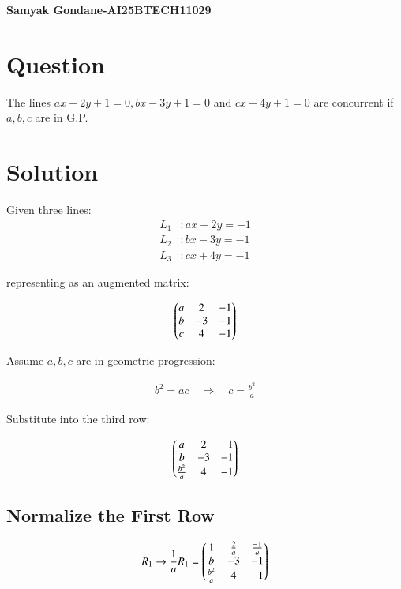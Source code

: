 \documentclass{article}
\begin{document}
\begin{center}
\large
    \textbf{Samyak Gondane-AI25BTECH11029}
\end{center}
\date{}

\section*{Question}
The lines $ax + 2y + 1 = 0, bx - 3y + 1 = 0$ and $cx + 4y + 1 = 0$ are concurrent if $a, b, c$ are in G.P.

\section*{Solution}

Given three lines:
\begin{align}
L_1 &: ax + 2y = -1 \\
L_2 &: bx - 3y = -1 \\
L_3 &: cx + 4y = -1
\end{align}

representing as an augmented matrix:

\begin{align}
\begin{pmatrix}
a & 2 & -1 \\
b & -3 & -1 \\
c & 4 & -1
\end{pmatrix}
\end{align}



Assume $a, b, c$ are in geometric progression:


\begin{align}
b^2 = ac \quad \Rightarrow \quad c = \frac{b^2}{a}
\end{align}

Substitute into the third row:

\begin{align}
\begin{pmatrix}
a & 2 & -1 \\
b & -3 & -1 \\
\frac{b^2}{a} & 4 & -1
\end{pmatrix}
\end{align}

\subsection*{Normalize the First Row}

\begin{align}
R_1 \rightarrow \frac{1}{a} R_1 = 
\begin{pmatrix}
1 & \frac{2}{a} & \frac{-1}{a} \\
b & -3 & -1 \\
\frac{b^2}{a} & 4 & -1
\end{pmatrix}
\end{align}
\end{document}
